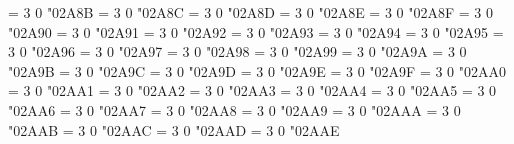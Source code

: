 \Umathchardef\lesseqqgtr = 3 0 "02A8B %
\Umathchardef\gtreqqless = 3 0 "02A8C %
\Umathchardef\lsime = 3 0 "02A8D %
\Umathchardef\gsime = 3 0 "02A8E %
\Umathchardef\lsimg = 3 0 "02A8F %
\Umathchardef\gsiml = 3 0 "02A90 %
\Umathchardef\lgE = 3 0 "02A91 %
\Umathchardef\glE = 3 0 "02A92 %
\Umathchardef\lesges = 3 0 "02A93 %
\Umathchardef\gesles = 3 0 "02A94 %
\Umathchardef\eqslantless = 3 0 "02A95 %
\Umathchardef\eqslantgtr = 3 0 "02A96 %
\Umathchardef\elsdot = 3 0 "02A97 %
\Umathchardef\egsdot = 3 0 "02A98 %
\Umathchardef\eqqless = 3 0 "02A99 %
\Umathchardef\eqqgtr = 3 0 "02A9A %
\Umathchardef\eqqslantless = 3 0 "02A9B %
\Umathchardef\eqqslantgtr = 3 0 "02A9C %
\Umathchardef\simless = 3 0 "02A9D %
\Umathchardef\simgtr = 3 0 "02A9E %
\Umathchardef\simlE = 3 0 "02A9F %
\Umathchardef\simgE = 3 0 "02AA0 %
\Umathchardef\Lt = 3 0 "02AA1 %
\Umathchardef\Gt = 3 0 "02AA2 %
\Umathchardef\partialmeetcontraction = 3 0 "02AA3 %
\Umathchardef\glj = 3 0 "02AA4 %
\Umathchardef\gla = 3 0 "02AA5 %
\Umathchardef\ltcc = 3 0 "02AA6 %
\Umathchardef\gtcc = 3 0 "02AA7 %
\Umathchardef\lescc = 3 0 "02AA8 %
\Umathchardef\gescc = 3 0 "02AA9 %
\Umathchardef\smt = 3 0 "02AAA %
\Umathchardef\lat = 3 0 "02AAB %
\Umathchardef\smte = 3 0 "02AAC %
\Umathchardef\late = 3 0 "02AAD %
\Umathchardef\bumpeqq = 3 0 "02AAE %
